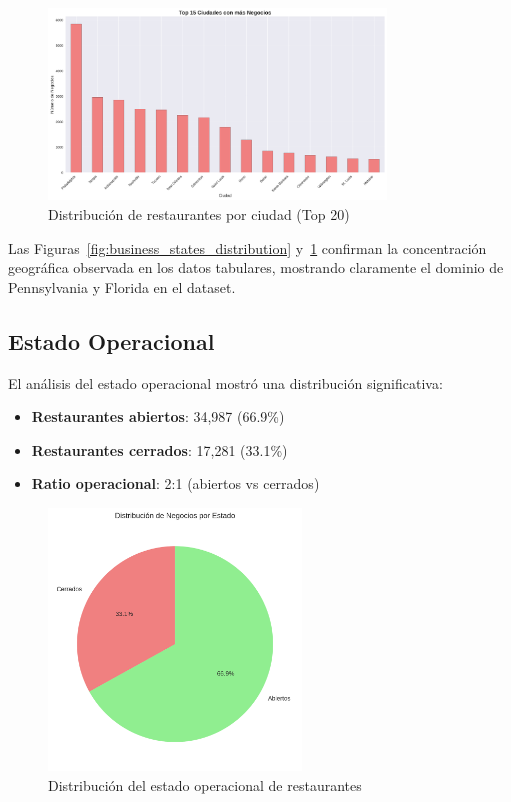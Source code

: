 \documentclass[12pt,a4paper,twoside,openany]{book}
\begin{document}
\begin{figure}[H]
\centering
\includegraphics[width=0.8\textwidth]{figures/business_cities_distribution.png}
\caption{Distribución de restaurantes por ciudad (Top 20)}
\label{fig:business_cities_distribution}
\end{figure}

Las Figuras~\ref{fig:business_states_distribution} y~\ref{fig:business_cities_distribution} confirman la concentración geográfica observada en los datos tabulares, mostrando claramente el dominio de Pennsylvania y Florida en el dataset.

\subsection{Estado Operacional}

El análisis del estado operacional mostró una distribución significativa:

\begin{itemize}
    \item \textbf{Restaurantes abiertos}: 34,987 (66.9\%)
    \item \textbf{Restaurantes cerrados}: 17,281 (33.1\%)
    \item \textbf{Ratio operacional}: 2:1 (abiertos vs cerrados)
\end{itemize}

\begin{figure}[H]
\centering
\includegraphics[width=0.6\textwidth]{figures/estado_negocios.png}
\caption{Distribución del estado operacional de restaurantes}
\label{fig:estado_negocios}
\end{figure}
\end{document}

